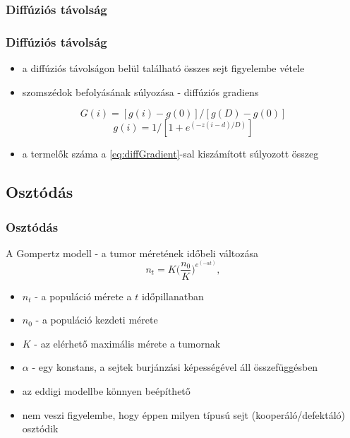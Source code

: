\subsubsection{Diffúziós távolság}
\begin{frame}
	\frametitle{Diffúziós távolság}
	\begin{block}{}
		\begin{itemize}
			\item a diffúziós távolságon belül található összes sejt figyelembe vétele
			\item szomszédok befolyásának súlyozása - diffúziós gradiens
		\end{itemize}
		\begin{equation}
			\label{eq:diffGradient}
			G(i) = [g(i) - g(0)]/[g(D) - g(0)] 
		\end{equation}
		\begin{equation}
			g(i) = 1/[1 + e^{(-z(i-d)/D)}]
		\end{equation}
	\end{block}
	\begin{block}{}
		\begin{itemize}
				\item a termelők száma a \ref{eq:diffGradient}-sal kiszámított súlyozott összeg
		\end{itemize}
	\end{block}
\end{frame}

\subsection{Osztódás}
\begin{frame}
	\frametitle{Osztódás}
	\begin{block}{A Gompertz modell - a tumor méretének időbeli változása}
		\begin{equation}
			n_t = K \bigg(\frac{n_0}{K} \bigg) ^ {e^{(- \alpha t)}},
		\end{equation}
		\begin{itemize}
			\item $n_t$ - a populáció mérete a $t$ időpillanatban
			\item $n_0$ - a populáció kezdeti mérete
			\item $K$ - az elérhető maximális mérete a tumornak
			\item $\alpha$ - egy konstans, a sejtek burjánzási képességével áll összefüggésben
		\end{itemize}
	\end{block}
	\pause
	\begin{block}{}
		\begin{itemize}
			\item az eddigi modellbe könnyen beépíthető
			\item nem veszi figyelembe, hogy éppen milyen típusú sejt (kooperáló/defektáló) osztódik
		\end{itemize}
	\end{block}
\end{frame}